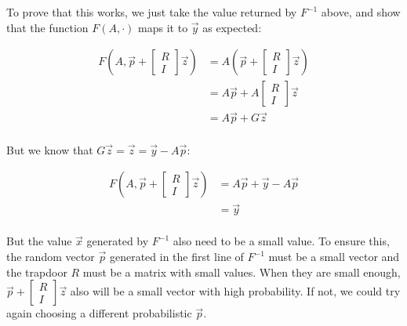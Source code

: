 \documentclass[a4paper]{article}
\begin{document}
 To prove that this works, we just take the value returned by $F^{-1}$ above, and show that the function $F(A, \cdot)$ maps it to $\overrightarrow{y}$ as expected:
 
 \begin{equation*}
 \begin{split}
 F(A, \overrightarrow{p} + \begin{bmatrix}R\\I\end{bmatrix}\overrightarrow{z}) &= A(\overrightarrow{p} + \begin{bmatrix}R\\I\end{bmatrix}\overrightarrow{z})\\
 &= A\overrightarrow{p} + A\begin{bmatrix}R\\I\end{bmatrix}\overrightarrow{z}\\
 &= A\overrightarrow{p} + G\overrightarrow{z}\\
 \end{split}
 \end{equation*}
 
 But we know that $G\overrightarrow{z}=\overrightarrow{z}=\overrightarrow{y} - A\overrightarrow{p}$:
 
  \begin{equation*}
 \begin{split}
 F(A, \overrightarrow{p} + \begin{bmatrix}R\\I\end{bmatrix}\overrightarrow{z}) &=
 A\overrightarrow{p} + \overrightarrow{y} - A\overrightarrow{p}\\
 &= \overrightarrow{y}\\
  \end{split}
 \end{equation*}
 
 But the value $\overrightarrow{x}$ generated by $F^{-1}$ also need to be a small value. To ensure this, the random vector $\overrightarrow{p}$ generated in the first line of $F^{-1}$ must be a small vector and the trapdoor $R$ must be a matrix with small 
 values. When they are small enough, $\overrightarrow{p} + \begin{bmatrix}R\\I\end{bmatrix}\overrightarrow{z}$ also will be a small vector with high probability. If not, we could try again choosing a different probabilistic $\overrightarrow{p}$.
 
\end{document}
